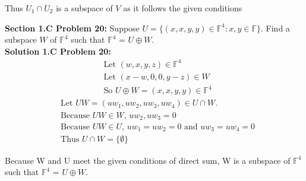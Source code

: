\documentclass[12pt]{article}
\begin{document}
\noindent Thus $U_1 \cap U_2$ is a subspace of $V$ as it follows the given conditions

\vspace{\baselineskip}
\noindent\textbf{Section 1.C Problem 20: }Suppose $U = \{(x,x,y,y) \in \mathbb{F}^4: x, y \in \mathbb{F}\}$.  Find a subspace $W$ of $\mathbb{F}^4$ such that $\mathbb{F}^4$ = $U \oplus W$. \\

\noindent\textbf{Solution 1.C Problem 20: }
	\begin{align}
		& \text{Let } (w,x,y,z) \in \mathbb{F}^4 \\
		& \text{Let } (x-w, 0, 0, y-z) \in W \\
		& \text{So } U \oplus W = (x,x,y,y) \in \mathbb{F}^4 
	\end{align}
	\begin{align}
		& \text{Let } UW = (uw_1, uw_2, uw_3, uw_4 ) \in U \cap W. \\
		& \text{Because } UW \in W \text{, } uw_2, uw_3 = 0 \\
		& \text{Because } UW \in U \text{, } uw_1 = uw_2 = 0 \text{ and } uw_3 = uw_4 = 0 \\
		& \text{Thus } U \cap W = \{ \emptyset \}
	\end{align}
	
Because W and U meet the given conditions of direct sum, W is a subspace of $\mathbb{F}^4$ such that $\mathbb{F}^4$ = $U \oplus W$. 
	
	
	
\end{document}
